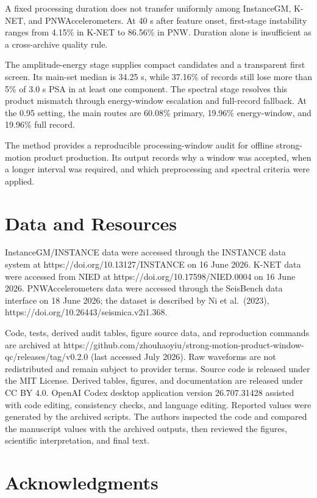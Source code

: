 \documentclass[12pt,letterpaper]{article}
\begin{document}
A fixed processing duration does not transfer uniformly among InstanceGM, K-NET, and PNWAccelerometers. At 40 s after feature onset, first-stage instability ranges from 4.15\% in K-NET to 86.56\% in PNW. Duration alone is insufficient as a cross-archive quality rule.

The amplitude-energy stage supplies compact candidates and a transparent first screen. Its main-set median is 34.25 s, while 37.16\% of records still lose more than 5\% of 3.0 s PSA in at least one component. The spectral stage resolves this product mismatch through energy-window escalation and full-record fallback. At the 0.95 setting, the main routes are 60.08\% primary, 19.96\% energy-window, and 19.96\% full record.

The method provides a reproducible processing-window audit for offline strong-motion product production. Its output records why a window was accepted, when a longer interval was required, and which preprocessing and spectral criteria were applied.

\section{Data and Resources}\label{data-and-resources}

InstanceGM/INSTANCE data were accessed through the INSTANCE data system at https://doi.org/10.13127/INSTANCE on 16 June 2026. K-NET data were accessed from NIED at https://doi.org/10.17598/NIED.0004 on 16 June 2026. PNWAccelerometers data were accessed through the SeisBench data interface on 18 June 2026; the dataset is described by Ni et al.~(2023), https://doi.org/10.26443/seismica.v2i1.368.

Code, tests, derived audit tables, figure source data, and reproduction commands are archived at https://github.com/zhouhaoyiu/strong-motion-product-window-qc/releases/tag/v0.2.0 (last accessed July 2026). Raw waveforms are not redistributed and remain subject to provider terms. Source code is released under the MIT License. Derived tables, figures, and documentation are released under CC BY 4.0. OpenAI Codex desktop application version 26.707.31428 assisted with code editing, consistency checks, and language editing. Reported values were generated by the archived scripts. The authors inspected the code and compared the manuscript values with the archived outputs, then reviewed the figures, scientific interpretation, and final text.

\section{Acknowledgments}\label{acknowledgments}
\end{document}
